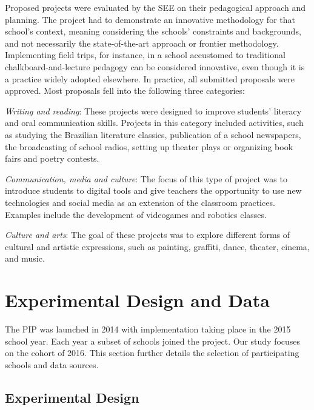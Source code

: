\documentclass[11pt,a4paper]{article}
\begin{document}
Proposed projects were evaluated by the SEE on their pedagogical approach and planning. The project had to demonstrate an innovative methodology for that school's context, meaning considering the schools' constraints and backgrounds, and not necessarily the state-of-the-art approach or frontier methodology. Implementing field trips, for instance, in a school accustomed to traditional chalkboard-and-lecture pedagogy can be considered innovative, even though it is a practice widely adopted elsewhere. In practice, all submitted proposals were approved. Most proposals fell into the following three categories: 

\textit{Writing and reading}: These projects were designed to improve students’ literacy and oral communication skills. Projects in this category included activities, such as studying the Brazilian literature classics, publication of a school newspapers, the broadcasting of school radios, setting up theater plays or organizing book fairs and poetry contests.
 
\textit{Communication, media and culture}: The focus of this type of project was to introduce students to digital tools and give teachers the opportunity to use new technologies and social media as an extension of the classroom practices. Examples include the development of videogames and robotics classes.
 
\textit{Culture and arts}: The goal of these projects was to explore different forms of cultural and artistic expressions, such as painting, graffiti, dance, theater, cinema, and music. 



\section{Experimental Design and Data} \label{sec:design_data}

The PIP was launched in 2014 with implementation taking place in the 2015 school year. Each year a subset of schools joined the project. Our study focuses on the cohort of 2016. This section further details the selection of participating schools and data sources.

\subsection{Experimental Design} \label{sec:experiment}
\end{document}
